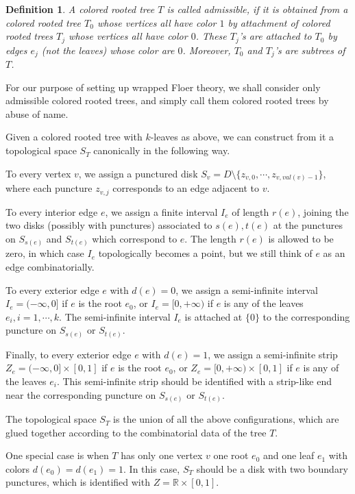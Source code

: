\documentclass{amsart}
\newtheorem{definition}[theorem]{Definition}
\numberwithin{equation}{section}
\numberwithin{figure}{section}
\begin{document}
\begin{definition}
	A colored rooted tree $T$ is called admissible, if it is obtained from a colored rooted tree $T_{0}$ whose vertices all have color $1$ by attachment of colored rooted trees $T_{j}$ whose vertices all have color $0$. These $T_{j}$'s are attached to $T_{0}$ by edges $e_{j}$ (not the leaves) whose color are $0$. Moreover, $T_{0}$ and $T_{j}$'s are subtrees of $T$.
\end{definition}

	For our purpose of setting up wrapped Floer theory, we shall consider only admissible colored rooted trees, and simply call them colored rooted trees by abuse of name. \par
	Given a colored rooted tree with $k$-leaves as above, we can construct from it a topological space $S_{T}$ canonically in the following way. \par
	To every vertex $v$, we assign a punctured disk $S_{v} = D \setminus \{z_{v, 0}, \cdots, z_{v, val(v)-1}\}$, where each puncture $z_{v, j}$ corresponds to an edge adjacent to $v$. \par
	To every interior edge $e$, we assign a finite interval $I_{e}$ of length $r(e)$, joining the two disks (possibly with punctures) associated to $s(e), t(e)$ at the punctures on $S_{s(e)}$ and $S_{t(e)}$ which correspond to $e$. The length $r(e)$ is allowed to be zero, in which case $I_{e}$ topologically becomes a point, but we still think of $e$ as an edge combinatorially. \par
	To every exterior edge $e$ with $d(e) = 0$, we assign a semi-infinite interval $I_{e} = (-\infty, 0]$ if $e$ is the root $e_{0}$, or $I_{e} = [0, +\infty)$ if $e$ is any of the leaves $e_{i}, i = 1, \cdots, k$. The semi-infinite interval $I_{e}$ is attached at $\{0\}$ to the corresponding puncture on $S_{s(e)}$ or $S_{t(e)}$.  \par
	Finally, to every exterior edge $e$ with $d(e) = 1$, we assign a semi-infinite strip $Z_{e} = (-\infty, 0] \times [0, 1]$ if $e$ is the root $e_{0}$, or $Z_{e} = [0, +\infty) \times [0, 1]$ if $e$ is any of the leaves $e_{i}$. This semi-infinite strip should be identified with a strip-like end near the corresponding puncture on $S_{s(e)}$ or $S_{t(e)}$. \par
	The topological space $S_{T}$ is the union of all the above configurations, which are glued together according to the combinatorial data of the tree $T$. \par
	One special case is when $T$ has only one vertex $v$ one root $e_{0}$ and one leaf $e_{1}$ with colors $d(e_{0}) = d(e_{1}) = 1$. In this case, $S_{T}$ should be a disk with two boundary punctures, which is identified with $Z = \mathbb{R} \times [0, 1]$. \par
\end{document}

